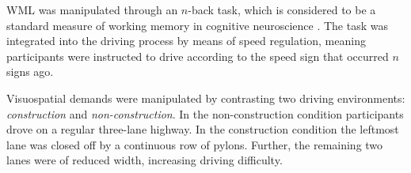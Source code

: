 WML was manipulated through an \(n\)-back task, which is considered to be a standard measure of working memory in cognitive neuroscience \citep{Kane2007}.
The task was integrated into the driving process by means of speed regulation, meaning participants were instructed to drive according to the speed sign that occurred \(n\) signs ago.

Visuospatial demands were manipulated by contrasting two driving environments: \textit{construction} and \textit{non-construction}.
In the non-construction condition participants drove on a regular three-lane highway.
In the construction condition the leftmost lane was closed off by a continuous row of pylons.
Further, the remaining two lanes were of reduced width, increasing driving difficulty.